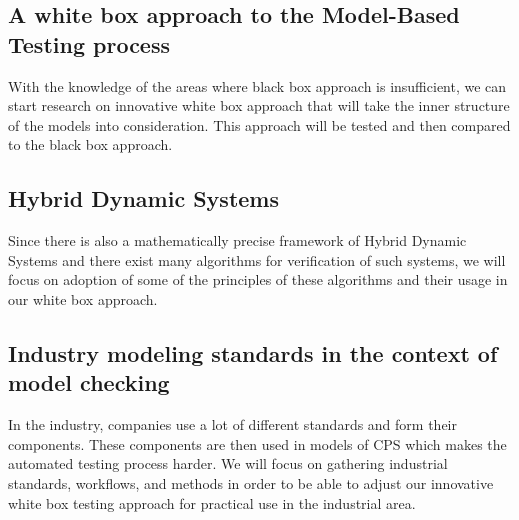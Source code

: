 \subsection{A white box approach to the Model-Based Testing process}
With the knowledge of the areas where black box approach is insufficient, we can start research on innovative white box approach that will take the inner structure of the models into consideration. This approach will be tested and then compared to the black box approach.

\subsection{Hybrid Dynamic Systems}
Since there is also a mathematically precise framework of Hybrid Dynamic Systems \cite{Shaft:HybridDynamicalSystems} and there exist many algorithms for verification of such systems, we will focus on adoption of some of the principles of these algorithms and their usage in our white box approach.

\subsection{Industry modeling standards in the context of model checking}
In the industry, companies use a lot of different standards and form their components. These components are then used in models of CPS which makes the automated testing process harder. We will focus on gathering industrial standards, workflows, and methods in order to be able to adjust our innovative white box testing approach for practical use in the industrial area. 
